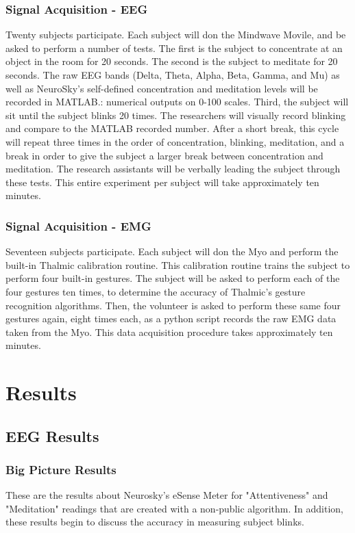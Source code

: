 \documentclass[journal]{IEEEtran}
\begin{document}
\subsubsection{Signal Acquisition - EEG}
Twenty subjects participate. Each subject will don the Mindwave Movile, and be asked to perform a number of tests. The first is the subject to concentrate at an object in the room for 20 seconds. The second is the subject to meditate for 20 seconds. The raw EEG bands (Delta, Theta, Alpha, Beta, Gamma, and Mu) as well as NeuroSky’s self-defined concentration and meditation levels will be recorded in MATLAB.: numerical outputs on 0-100 scales. Third, the subject will sit until the subject blinks 20 times. The researchers will visually record blinking and compare to the MATLAB recorded number. After a short break, this cycle will repeat three times in the order of concentration, blinking, meditation, and a break in order to give the subject a larger break between concentration and meditation. The research assistants will be verbally leading the subject through these tests. This entire experiment per subject will take approximately ten minutes.

\subsubsection{Signal Acquisition - EMG}
Seventeen subjects participate. Each subject will don the Myo and perform the built-in Thalmic calibration routine. This calibration routine trains the subject to perform four built-in gestures. The subject will be asked to perform each of the four gestures ten times, to determine the accuracy of Thalmic's gesture recognition algorithms. Then, the volunteer is asked to perform these same four gestures again, eight times each, as a python script records the raw EMG data taken from the Myo. This data acquisition procedure takes approximately ten minutes.

\section{Results}
\subsection{EEG Results} \par
\subsubsection{Big Picture Results}
These are the results about Neurosky's eSense Meter for "Attentiveness" and "Meditation" readings that are created with a non-public algorithm. In addition, these results begin to discuss the accuracy in measuring subject blinks.
\end{document}
